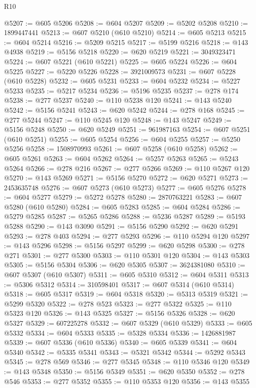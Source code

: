 \begin{lexlean}{R10}
\begin{coremodule}
{{{{{{{{{{{{{{{{{{{{{{{{{{{{{{{{{{{{{{{{{{{{{{{{{{{{{{{{{{{{{{{{{{{{{{{{{{{{{{{{{{{{@5207 := @605 @5206
@5208 := @604 @5207
@5209 := @5202 @5208
@5210 := 1899447441
@5213 := @607 @5210 (@610 @5210)
@5214 := @605 @5213
@5215 := @604 @5214
@5216 := @5209 @5215
@5217 := @5199 @5216
@5218 := @143 @4938
@5219 := @5156 @5218
@5220 := @620 @5219
@5221 := 3049323471
@5224 := @607 @5221 (@610 @5221)
@5225 := @605 @5224
@5226 := @604 @5225
@5227 := @5220 @5226
@5228 := 3921009573
@5231 := @607 @5228 (@610 @5228)
@5232 := @605 @5231
@5233 := @604 @5232
@5234 := @5227 @5233
@5235 := @5217 @5234
@5236 := @5196 @5235
@5237 := @278 @174
@5238 := @277 @5237
@5240 := @110 @5238 @120
@5241 := @143 @5240
@5242 := @5156 @5241
@5243 := @620 @5242
@5244 := @278 @168
@5245 := @277 @5244
@5247 := @110 @5245 @120
@5248 := @143 @5247
@5249 := @5156 @5248
@5250 := @620 @5249
@5251 := 961987163
@5254 := @607 @5251 (@610 @5251)
@5255 := @605 @5254
@5256 := @604 @5255
@5257 := @5250 @5256
@5258 := 1508970993
@5261 := @607 @5258 (@610 @5258)
@5262 := @605 @5261
@5263 := @604 @5262
@5264 := @5257 @5263
@5265 := @5243 @5264
@5266 := @278 @216
@5267 := @277 @5266
@5269 := @110 @5267 @120
@5270 := @143 @5269
@5271 := @5156 @5270
@5272 := @620 @5271
@5273 := 2453635748
@5276 := @607 @5273 (@610 @5273)
@5277 := @605 @5276
@5278 := @604 @5277
@5279 := @5272 @5278
@5280 := 2870763221
@5283 := @607 @5280 (@610 @5280)
@5284 := @605 @5283
@5285 := @604 @5284
@5286 := @5279 @5285
@5287 := @5265 @5286
@5288 := @5236 @5287
@5289 := @5193 @5288
@5290 := @143 @3090
@5291 := @5156 @5290
@5292 := @620 @5291
@5293 := @278 @403
@5294 := @277 @5293
@5296 := @110 @5294 @120
@5297 := @143 @5296
@5298 := @5156 @5297
@5299 := @620 @5298
@5300 := @278 @271
@5301 := @277 @5300
@5303 := @110 @5301 @120
@5304 := @143 @5303
@5305 := @5156 @5304
@5306 := @620 @5305
@5307 := 3624381080
@5310 := @607 @5307 (@610 @5307)
@5311 := @605 @5310
@5312 := @604 @5311
@5313 := @5306 @5312
@5314 := 310598401
@5317 := @607 @5314 (@610 @5314)
@5318 := @605 @5317
@5319 := @604 @5318
@5320 := @5313 @5319
@5321 := @5299 @5320
@5322 := @278 @523
@5323 := @277 @5322
@5325 := @110 @5323 @120
@5326 := @143 @5325
@5327 := @5156 @5326
@5328 := @620 @5327
@5329 := 607225278
@5332 := @607 @5329 (@610 @5329)
@5333 := @605 @5332
@5334 := @604 @5333
@5335 := @5328 @5334
@5336 := 1426881987
@5339 := @607 @5336 (@610 @5336)
@5340 := @605 @5339
@5341 := @604 @5340
@5342 := @5335 @5341
@5343 := @5321 @5342
@5344 := @5292 @5343
@5345 := @278 @569
@5346 := @277 @5345
@5348 := @110 @5346 @120
@5349 := @143 @5348
@5350 := @5156 @5349
@5351 := @620 @5350
@5352 := @278 @546
@5353 := @277 @5352
@5355 := @110 @5353 @120
@5356 := @143 @5355
}}}}}}}}}}}}}}}}}}}}}}}}}}}}}}}}}}}}}}}}}}}}}}}}}}}}}}}}}}}}}}}}}}}}}}}}}}}}}}}}}}}}
\end{coremodule}
\end{lexlean}
